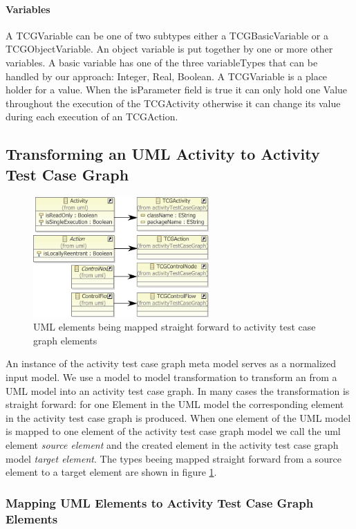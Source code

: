 \paragraph{Variables}
A TCGVariable can be one of two subtypes either a TCGBasicVariable or a TCGObjectVariable. An object variable is put together by one or more other variables. A basic variable has one of the three variableTypes that can be handled by our approach: Integer, Real, Boolean. A TCGVariable is a place holder for a value. When the isParameter field is true it can only hold one Value throughout the execution of the TCGActivity otherwise it can change its value during each execution of an TCGAction.

\subsection{Transforming an UML Activity to Activity Test Case Graph}
\label{sec:uml2atcg}
\begin{figure}
\label{fig:UML2TCGTranformation}
\includegraphics[width=0.6\textwidth]{./pics/UML2TCGTransformation.pdf}
\caption{UML elements being mapped straight forward to activity test case graph elements}
\end{figure}
An instance of the activity test case graph meta model serves as a normalized input model. We use a model to model transformation to transform an  from a UML model into an activity test case graph. In many cases the transformation is straight forward: for one Element in the UML model the corresponding element in the activity test case graph is produced. When one element of the UML model is mapped to one element of the activity test case graph model we call the uml element \emph{source element} and the created element in the activity test case graph model \emph{target element}. The types beeing mapped straight forward from a source element to a target element are shown in figure \ref{fig:UML2TCGTranformation}.
\subsubsection{Mapping UML Elements to Activity Test Case Graph Elements}
